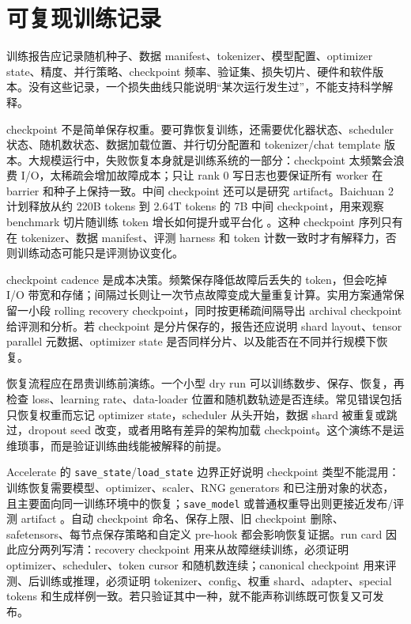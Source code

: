 \documentclass[UTF8,zihao=-4,openany]{ctexbook}
\begin{document}
\section{可复现训练记录}
训练报告应记录随机种子、数据 manifest、tokenizer、模型配置、optimizer state、精度、并行策略、checkpoint 频率、验证集、损失切片、硬件和软件版本。没有这些记录，一个损失曲线只能说明“某次运行发生过”，不能支持科学解释。

checkpoint 不是简单保存权重。要可靠恢复训练，还需要优化器状态、scheduler 状态、随机数状态、数据加载位置、并行切分配置和 tokenizer/chat template 版本。大规模运行中，失败恢复本身就是训练系统的一部分：checkpoint 太频繁会浪费 I/O，太稀疏会增加故障成本；只让 rank 0 写日志也要保证所有 worker 在 barrier 和种子上保持一致。中间 checkpoint 还可以是研究 artifact。Baichuan 2 计划释放从约 220B tokens 到 2.64T tokens 的 7B 中间 checkpoint，用来观察 benchmark 切片随训练 token 增长如何提升或平台化 \cite{yang2023baichuan2}。这种 checkpoint 序列只有在 tokenizer、数据 manifest、评测 harness 和 token 计数一致时才有解释力，否则训练动态可能只是评测协议变化。

checkpoint cadence 是成本决策。频繁保存降低故障后丢失的 token，但会吃掉 I/O 带宽和存储；间隔过长则让一次节点故障变成大量重复计算。实用方案通常保留一小段 rolling recovery checkpoint，同时按更稀疏间隔导出 archival checkpoint 给评测和分析。若 checkpoint 是分片保存的，报告还应说明 shard layout、tensor parallel 元数据、optimizer state 是否同样分片、以及能否在不同并行规模下恢复。

恢复流程应在昂贵训练前演练。一个小型 dry run 可以训练数步、保存、恢复，再检查 loss、learning rate、data-loader 位置和随机数轨迹是否连续。常见错误包括只恢复权重而忘记 optimizer state，scheduler 从头开始，数据 shard 被重复或跳过，dropout seed 改变，或者用略有差异的架构加载 checkpoint。这个演练不是运维琐事，而是验证训练曲线能被解释的前提。

Accelerate 的 \texttt{save\_state}/\texttt{load\_state} 边界正好说明 checkpoint 类型不能混用：训练恢复需要模型、optimizer、scaler、RNG generators 和已注册对象的状态，且主要面向同一训练环境中的恢复；\texttt{save\_model} 或普通权重导出则更接近发布/评测 artifact \cite{huggingface2026acceleratecheckpoint,huggingface2026accelerator}。自动 checkpoint 命名、保存上限、旧 checkpoint 删除、safetensors、每节点保存策略和自定义 pre-hook 都会影响恢复证据。run card 因此应分两列写清：recovery checkpoint 用来从故障继续训练，必须证明 optimizer、scheduler、token cursor 和随机数连续；canonical checkpoint 用来评测、后训练或推理，必须证明 tokenizer、config、权重 shard、adapter、special tokens 和生成样例一致。若只验证其中一种，就不能声称训练既可恢复又可发布。
\end{document}
